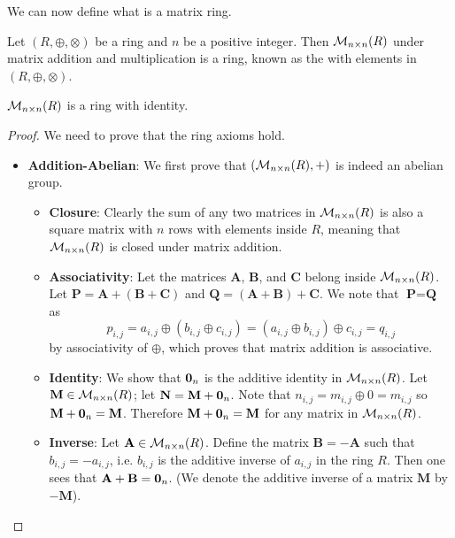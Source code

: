 We can now define what is a matrix ring.
\begin{definition}
    Let $(R, \oplus, \otimes)$ be a ring and $n$ be a positive integer. Then $\mathcal{M}_{n\times n}(R)$ under matrix addition and multiplication is a ring, known as the  with elements in $(R, \oplus, \otimes)$.
\end{definition}
\begin{proposition}
    $\mathcal{M}_{n\times n}(R)$ is a ring with identity.
\end{proposition}
\begin{proof}
    We need to prove that the ring axioms hold.
    \begin{itemize}
        \item \textbf{Addition-Abelian}: We first prove that $(\mathcal{M}_{n\times n}(R), +)$ is indeed an abelian group.
        \begin{itemize}
            \item \textbf{Closure}: Clearly the sum of any two matrices in $\mathcal{M}_{n\times n}(R)$ is also a square matrix with $n$ rows with elements inside $R$, meaning that $\mathcal{M}_{n\times n}(R)$ is closed under matrix addition.

            \item \textbf{Associativity}: Let the matrices $\textbf{A}$, $\textbf{B}$, and $\textbf{C}$ belong inside $\mathcal{M}_{n\times n}(R)$. Let $\textbf{P} = \textbf{A} + (\textbf{B} + \textbf{C})$ and $\textbf{Q} = (\textbf{A} + \textbf{B}) + \textbf{C}$. We note that $\textbf{P} = \textbf{Q}$ as
            \[
                p_{i,j} = a_{i,j} \oplus (b_{i,j} \oplus c_{i,j}) = (a_{i,j} \oplus b_{i,j}) \oplus c_{i,j} = q_{i,j}
            \]
            by associativity of $\oplus$, which proves that matrix addition is associative.

            \item \textbf{Identity}: We show that $\textbf{0}_{n}$ is the additive identity in $\mathcal{M}_{n\times n}(R)$. Let $\textbf{M} \in \mathcal{M}_{n\times n}(R)$; let $\textbf{N} = \textbf{M} + \textbf{0}_{n}$. Note that $n_{i,j} = m_{i,j} \oplus 0 = m_{i,j}$ so $\textbf{M} + \textbf{0}_{n} = \textbf{M}$. Therefore $\textbf{M} + \textbf{0}_{n} = \textbf{M}$ for any matrix in $\mathcal{M}_{n\times n}(R)$.

            \item \textbf{Inverse}: Let $\textbf{A} \in \mathcal{M}_{n\times n}(R)$. Define the matrix $\textbf{B} = -\textbf{A}$ such that $b_{i,j} = -a_{i,j}$, i.e. $b_{i,j}$ is the additive inverse of $a_{i,j}$ in the ring $R$. Then one sees that $\textbf{A} + \textbf{B} = \textbf{0}_{n}$. (We denote the additive inverse of a matrix $\textbf{M}$ by $-\textbf{M}$).


\end{itemize}
\end{itemize}
\end{proof}
